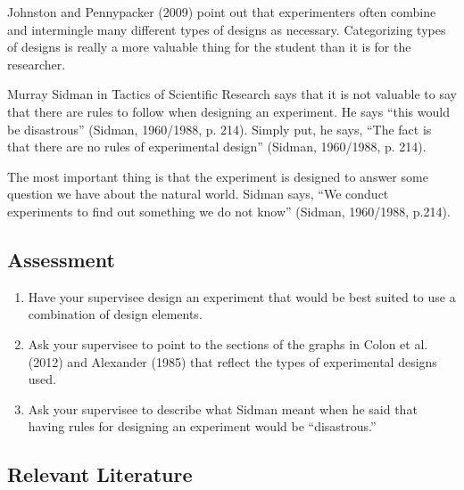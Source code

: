 Johnston and Pennypacker (2009) point out that experimenters often combine and intermingle many different types of designs as necessary. Categorizing types of designs is really a more valuable thing for the student than it is for the researcher. 

Murray Sidman in Tactics of Scientific Research says that it is not valuable to say that there are rules to follow when designing an experiment. He says ``this would be disastrous'' (Sidman, 1960/1988, p. 214). Simply put, he says, ``The fact is that there are no rules of experimental design'' (Sidman, 1960/1988, p. 214).

The most important thing is that the experiment is designed to answer some question we have about the natural world. Sidman says, ``We conduct experiments to find out something we do not know'' (Sidman, 1960/1988, p.214).
%
\subsection{Assessment}
\begin{enumerate}
\item Have your supervisee design an experiment that would be best suited to use a combination of design elements.
\item Ask your supervisee to point to the sections of the graphs in Colon et al. (2012) and Alexander (1985) that reflect the types of experimental designs used. 
\item Ask your supervisee to describe what Sidman meant when he said that having rules for designing an experiment would be ``disastrous.''
\end{enumerate}
%
\subsection{Relevant Literature}
\begin{refsection}
\nocite{test,alang2017police,clayton2018black}
\printbibliography[heading=none]
\end{refsection}
%                                                                   
